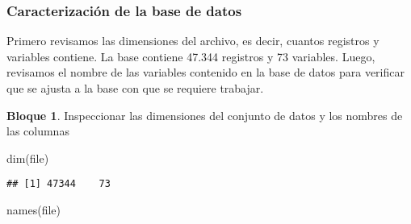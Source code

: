 \documentclass[
]{book}
\newenvironment{Shaded}{\begin{snugshade}}{\end{snugshade}}
\newcommand{\FunctionTok}[1]{\textcolor[rgb]{0.00,0.00,0.00}{#1}}
\newcommand{\NormalTok}[1]{#1}
\theoremstyle{definition}
\theoremstyle{definition}
\newtheorem{example}{Bloque}[chapter]
\theoremstyle{definition}
\theoremstyle{definition}
\theoremstyle{remark}
\begin{document}
\hypertarget{caracterizaciuxf3n-de-la-base-de-datos}{%
\subsubsection{Caracterización de la base de datos}\label{caracterizaciuxf3n-de-la-base-de-datos}}

Primero revisamos las dimensiones del archivo, es decir, cuantos registros y variables contiene. La base contiene 47.344 registros y 73 variables. Luego, revisamos el nombre de las variables contenido en la base de datos para verificar que se ajusta a la base con que se requiere trabajar.

\begin{example}
\protect\hypertarget{exm:bloque3nbm}{}\label{exm:bloque3nbm}Inspeccionar las dimensiones del conjunto de datos y los nombres de las columnas
\end{example}

\begin{Shaded}
\begin{Highlighting}[]
\FunctionTok{dim}\NormalTok{(file)}
\end{Highlighting}
\end{Shaded}

\begin{verbatim}
## [1] 47344    73
\end{verbatim}

\begin{Shaded}
\begin{Highlighting}[]
\FunctionTok{names}\NormalTok{(file)}
\end{Highlighting}
\end{Shaded}
\end{document}

